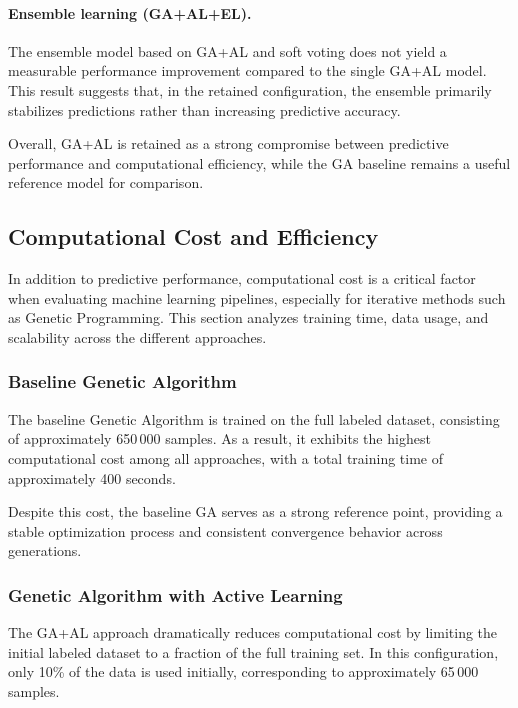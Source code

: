 \documentclass[12pt,a4paper]{article}
\begin{document}
\medskip

\paragraph{Ensemble learning (GA+AL+EL).}
The ensemble model based on GA+AL and soft voting does not yield a measurable performance improvement compared to the single GA+AL model. This result suggests that, in the retained configuration, the ensemble primarily stabilizes predictions rather than increasing predictive accuracy.

\medskip

Overall, GA+AL is retained as a strong compromise between predictive performance and computational efficiency, while the GA baseline remains a useful reference model for comparison.

\subsection{Computational Cost and Efficiency}

In addition to predictive performance, computational cost is a critical factor when evaluating machine learning pipelines, especially for iterative methods such as Genetic Programming. This section analyzes training time, data usage, and scalability across the different approaches.

\medskip

\subsubsection{Baseline Genetic Algorithm}

The baseline Genetic Algorithm is trained on the full labeled dataset, consisting of approximately 650\,000 samples. As a result, it exhibits the highest computational cost among all approaches, with a total training time of approximately 400 seconds.

Despite this cost, the baseline GA serves as a strong reference point, providing a stable optimization process and consistent convergence behavior across generations.

\medskip

\subsubsection{Genetic Algorithm with Active Learning}

The GA+AL approach dramatically reduces computational cost by limiting the initial labeled dataset to a fraction of the full training set. In this configuration, only 10\% of the data is used initially, corresponding to approximately 65\,000 samples.
\end{document}
